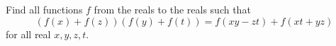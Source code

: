 Find all functions $f$ from the reals to the reals such that \[ \left(f(x)+f(z)\right)\left(f(y)+f(t)\right)=f(xy-zt)+f(xt+yz)  \] for all real $x,y,z,t$.